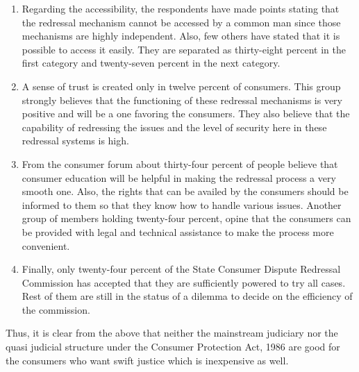 \begin{multicols}{2}
\begin{enumerate}[label=$\bullet$]
\item Regarding the accessibility, the respondents have made points stating that the redressal
mechanism cannot be accessed by a common man since those mechanisms are highly
independent. Also, few others have stated that it is possible to access it easily. They are
separated as thirty-eight percent in the first category and twenty-seven percent in the
next category.

\item A sense of trust is created only in twelve percent of consumers. This group strongly
believes that the functioning of these redressal mechanisms is very positive and will be
a one favoring the consumers. They also believe that the capability of redressing the
issues and the level of security here in these redressal systems is high.

\item From the consumer forum about thirty-four percent of people believe that consumer
education will be helpful in making the redressal process a very smooth one. Also, the
rights that can be availed by the consumers should be informed to them so that they
know how to handle various issues. Another group of members holding twenty-four
percent, opine that the consumers can be provided with legal and technical assistance
to make the process more convenient.

\item Finally, only twenty-four percent of the State Consumer Dispute Redressal
Commission has accepted that they are sufficiently powered to try all cases. Rest of
them are still in the status of a dilemma to decide on the efficiency of the commission.
\end{enumerate}

\vspace{-.3cm}

\noi
Thus, it is clear from the above that neither the mainstream judiciary nor the quasi judicial
structure under the Consumer Protection Act, 1986 are good for the consumers who want swift
justice which is inexpensive as well.



\end{multicols}
